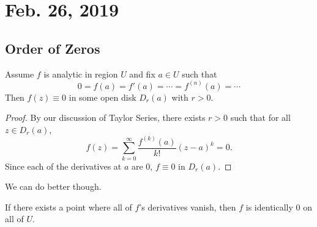 \section{Feb. 26, 2019}

\subsection{Order of Zeros}

\begin{theorem}
    Assume $f$ is analytic in region $U$ and fix $a \in U$ such that
    \[ 0 = f(a) = f'(a) = \cdots = f^{(n)}(a) = \cdots \]
    Then $f(z) \equiv 0$ in some open disk $D_r(a)$ with
    $r > 0$.
\end{theorem}

\begin{proof}
    By our discussion of Taylor Series, there exists $r > 0$
    such that for all $z \in D_r(a)$,
    \[ f(z) = \sum_{k=0}^{\infty} \frac{f^{(k)}(a)}{k!}(z-a)^k
    = 0. \]
    Since each of the derivatives at $a$ are $0$, $f \equiv 0$ 
    in $D_r(a)$.
\end{proof}

We can do better though.

\begin{theorem}
    If there exists a point where all of $f$'s derivatives 
    vanish, then $f$ is identically $0$ on all of $U$.
\end{theorem}

